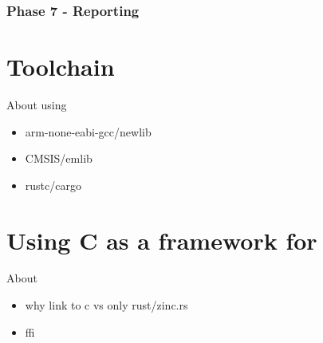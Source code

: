 \subsubsection{Phase 7 - Reporting}

\section{Toolchain}

About using
\begin{itemize}
 \item arm-none-eabi-gcc/newlib
 \item CMSIS/emlib
 \item rustc/cargo
\end{itemize}

\section{Using C as a framework for \rust}

About
\begin{itemize}
 \item why link to c vs only rust/zinc.rs
 \item ffi
\end{itemize}
